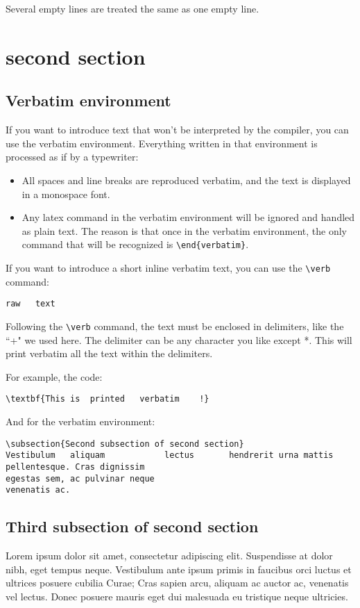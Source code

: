 \documentclass{article}
\begin{document}
Several empty lines are treated the same as one empty line.


\section{second section}

\subsection{Verbatim environment}

If you want to introduce text that won't be interpreted by the compiler, you
can use the verbatim environment. Everything written in that environment is
processed as if by a typewriter:

\begin{itemize}
    \item All spaces and line breaks are reproduced verbatim, and the text is
    displayed in a monospace font.
    \item Any latex command in the verbatim environment will be ignored and
    handled as plain text. The reason is that once in the verbatim environment,
    the only command that will be recognized is \verb`\end{verbatim}`.
\end{itemize}

If you want to introduce a short inline verbatim text, you can use the 
\verb`\verb` command:

\verb+raw   text+

Following the \verb`\verb` command, the text must be enclosed in delimiters,
like the ``+" we used here. The delimiter can be any character you like
except *. This will print verbatim all the text within the delimiters.

For example, the code:

\verb|\textbf{This is  printed   verbatim    !}|

And for the verbatim environment:

\begin{verbatim}
\subsection{Second subsection of second section}
Vestibulum   aliquam            lectus       hendrerit urna mattis pellentesque. Cras dignissim
egestas sem, ac pulvinar neque
venenatis ac.
\end{verbatim}

\subsection{Third subsection of second section}

Lorem ipsum dolor sit amet, consectetur adipiscing elit. Suspendisse at dolor nibh, eget tempus neque. Vestibulum ante ipsum primis in faucibus orci luctus et ultrices posuere cubilia Curae; Cras sapien arcu, aliquam ac auctor ac, venenatis vel lectus. Donec posuere mauris eget dui malesuada eu tristique neque ultricies.
\end{document}
